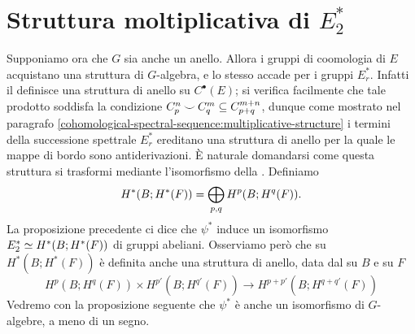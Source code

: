 \section{Struttura moltiplicativa di \texorpdfstring{$E^*_2$}{E*2}}
Supponiamo ora che $G$ sia anche un anello. Allora i gruppi di coomologia di $E$ acquistano una struttura di $G$-algebra, e lo stesso accade per i gruppi $E^\ast_r$. Infatti il \cupproduct{} definisce una struttura di anello su $C^\bullet(E)$; si verifica facilmente che tale prodotto soddisfa la condizione $C^n_p\mathbin{\smile} C^m_q\subseteq C^{m+n}_{p+q}$, dunque come mostrato nel paragrafo \ref{cohomological-spectral-sequence:multiplicative-structure} i termini della successione spettrale $E^\ast_r$ ereditano una struttura di anello per la quale le mappe di bordo sono antiderivazioni. È naturale domandarsi come questa struttura si trasformi mediante l'isomorfismo della .
Definiamo
$$
H^*(B;H^*(F))=\bigoplus_{p,q}H^p(B;H^q(F)).
$$
La proposizione precedente ci dice che $\psi^*$ induce un isomorfismo $E^\ast_2\simeq H^*(B;H^*(F))$ di gruppi abeliani.
Osserviamo però che su $H^*(B;H^*(F))$ è definita anche una struttura di anello, data dal \cupproduct{} su $B$ e su $F$
$$
H^p(B;H^q(F))\times H^{p'}(B;H^{q'}(F))\longrightarrow H^{p+p'}(B;H^{q+q'}(F))
$$
Vedremo con la proposizione seguente che $\psi^*$ è anche un isomorfismo di $G$-algebre, a meno di un segno.

